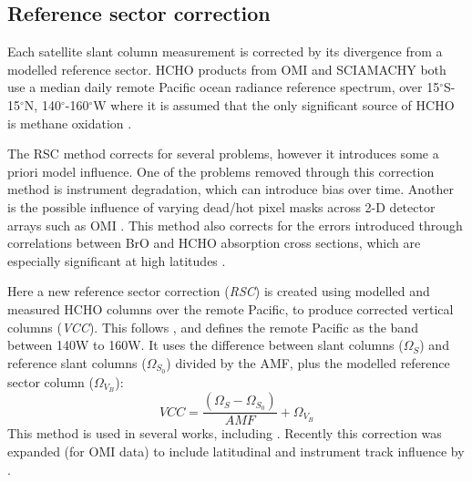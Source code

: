   \subsection{Reference sector correction}
  
    
    \label{Model:omiRecalc:RSC}
    Each satellite slant column measurement is corrected by its divergence from a modelled reference sector.
    HCHO products from OMI and SCIAMACHY both use a median daily remote Pacific ocean radiance reference spectrum, over 15$^{\circ}$S-15$^{\circ}$N, 140$^{\circ}$-160$^{\circ}$W where it is assumed that the only significant source of HCHO is methane oxidation \parencite{DeSmedt2008,Barkley2013,Kurosu2014}.
    
    The RSC method corrects for several problems, however it introduces some a priori model influence.
    One of the problems removed through this correction method is instrument degradation, which can introduce bias over time.
    Another is the possible influence of varying dead/hot pixel masks across 2-D detector arrays such as OMI \parencite{DeSmedt2015}.
    This method also corrects for the errors introduced through correlations between BrO and HCHO absorption cross sections, which are especially significant at high latitudes \parencite{Abad2015}.
    
    Here a new reference sector correction (\textit{RSC}) is created using modelled and measured HCHO columns over the remote Pacific, to produce corrected vertical columns (\textit{VCC}).
    This follows \textcite{Abad2016}, and defines the remote Pacific as the band between 140{\degr}W to 160{\degr}W.
    It uses the difference between slant columns ($\Omega_S$) and reference slant columns ($\Omega_{S_0}$) divided by the AMF, plus the modelled reference sector column ($\Omega_{V_B}$):
    \begin{equation*}
      VCC = \frac{ \left( \Omega_S - \Omega_{S_0} \right) }{ AMF } + \Omega_{V_B}
    \end{equation*}
    This method is used in several works, including \textcite[e.g.,][]{DeSmedt2008, DeSmedt2012, DeSmedt2015, Barkley2013, Bauwens2016}.
    Recently this correction was expanded (for OMI data) to include latitudinal and instrument track influence by \textcite{Abad2015}.
    
